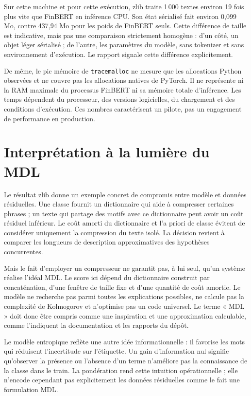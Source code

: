 \documentclass[11pt,a4paper]{article}
\begin{document}
Sur cette machine et pour cette exécution, zlib traite 1\,000 textes environ
19 fois plus vite que FinBERT en inférence CPU. Son état sérialisé fait
environ 0,099 Mo, contre 437,94 Mo pour les poids de FinBERT seuls. Cette
différence de taille est indicative, mais pas une comparaison strictement
homogène : d'un côté, un objet léger sérialisé ; de l'autre, les paramètres
du modèle, sans tokenizer et sans environnement d'exécution. Le rapport
signale cette différence explicitement.

De même, le pic mémoire de \texttt{tracemalloc} ne mesure que les
allocations Python observées et ne couvre pas les allocations natives de
PyTorch. Il ne représente ni la RAM maximale du processus FinBERT ni sa
mémoire totale d'inférence. Les temps dépendent du processeur, des versions
logicielles, du chargement et des conditions d'exécution. Ces nombres
caractérisent un pilote, pas un engagement de performance en production.

\section{Interprétation à la lumière du MDL}

Le résultat zlib donne un exemple concret de compromis entre modèle et
données résiduelles. Une classe fournit un dictionnaire qui aide à compresser
certaines phrases ; un texte qui partage des motifs avec ce dictionnaire peut
avoir un coût résiduel inférieur. Le coût amorti du dictionnaire et l'a priori
de classe évitent de considérer uniquement la compression du texte isolé.
La décision revient à comparer les longueurs de description approximatives
des hypothèses concurrentes.

Mais le fait d'employer un compresseur ne garantit pas, à lui seul, qu'un
système réalise l'idéal MDL. Le score ici dépend du dictionnaire construit par
concaténation, d'une fenêtre de taille fixe et d'une quantité de coût
amortie. Le modèle ne recherche pas parmi toutes les explications possibles,
ne calcule pas la complexité de Kolmogorov et n'optimise pas un code
universel. Le terme « MDL » doit donc être compris comme une inspiration et
une approximation calculable, comme l'indiquent la documentation et les
rapports du dépôt.

Le modèle entropique reflète une autre idée informationnelle : il favorise les
mots qui réduisent l'incertitude sur l'étiquette. Un gain d'information nul
signifie qu'observer la présence ou l'absence d'un terme n'améliore pas la
connaissance de la classe dans le train. La pondération rend cette intuition
opérationnelle ; elle n'encode cependant pas explicitement les données
résiduelles comme le fait une formulation MDL.
\end{document}
